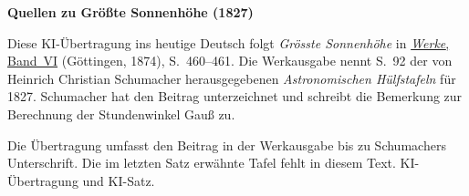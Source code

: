 \clearpage\thispagestyle{empty}
\begin{center}\textbf{Quellen zu Größte Sonnenhöhe (1827)}\end{center}
\noindent Diese KI-Übertragung ins heutige Deutsch folgt \textit{Grösste Sonnenhöhe} in \href{https://gdz.sub.uni-goettingen.de/id/PPN236007467}{\textit{Werke}, Band~VI} (Göttingen, 1874), S.~460--461. Die Werkausgabe nennt S.~92 der von Heinrich Christian Schumacher herausgegebenen \textit{Astronomischen Hülfstafeln} für 1827. Schumacher hat den Beitrag unterzeichnet und schreibt die Bemerkung zur Berechnung der Stundenwinkel Gauß zu.
\par\smallskip\noindent Die Übertragung umfasst den Beitrag in der Werkausgabe bis zu Schumachers Unterschrift. Die im letzten Satz erwähnte Tafel fehlt in diesem Text. KI-Übertragung und KI-Satz.
\clearpage
